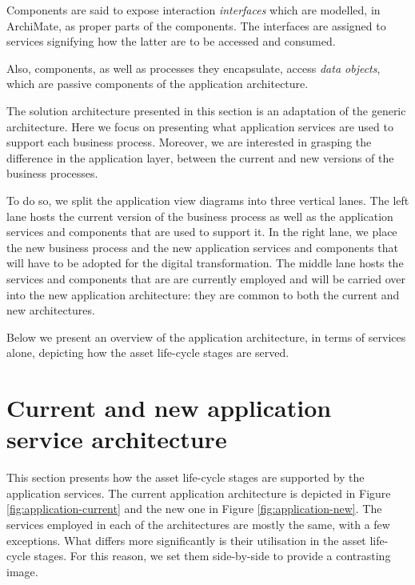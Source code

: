 	Components are said to expose interaction \textit{interfaces} which are modelled, in ArchiMate, as proper parts of the components. The interfaces are assigned to services signifying how the latter are to be accessed and consumed. 
	
	Also, components, as well as processes they encapsulate, access \textit{data objects}, which are passive components of the application architecture.

	The solution architecture presented in this section is an adaptation of the generic architecture. Here we focus on presenting what application services are used to support each business process. Moreover, we are interested in grasping the difference in the application layer, between the current and new versions of the business processes. 
	
	To do so, we split the application view diagrams into three vertical lanes. The left lane hosts the current version of the business process as well as the application services and components that are used to support it. In the right lane, we place the new business process and the new application services and components that will have to be adopted for the digital transformation. The middle lane hosts the services and components that are are currently employed and will be carried over into the new application architecture: they are common to both the current and new architectures.

	Below we present an overview of the application architecture, in terms of services alone, depicting how the asset life-cycle stages are served.
	
	\section{Current and new application service architecture}
	\label{sec:application-overview}
	
	This section presents how the asset life-cycle stages are supported by the application services. The current application architecture is depicted in Figure \ref{fig:application-current} and the new one in Figure \ref{fig:application-new}. The services employed in each of the architectures are mostly the same, with a few exceptions. What differs more significantly is their utilisation in the asset life-cycle stages. For this reason, we set them side-by-side to provide a contrasting image. 
	
